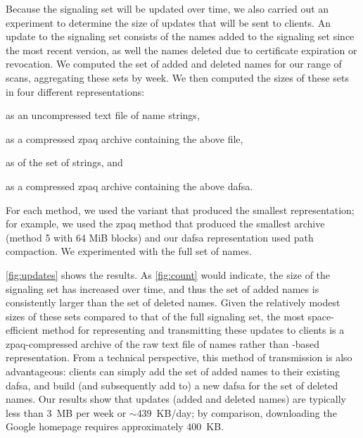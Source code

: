 Because the signaling set will be updated over time, we also carried out an
experiment to determine the size of updates that will be sent to clients. 
An update to the signaling set consists of the names added to the signaling
set since the most recent version, as well the names 
deleted due to certificate expiration or revocation. We computed the set of
added and deleted names for our range of scans, aggregating these sets by week.
We then computed the sizes of these sets in four different representations:
\begin{inparaenum}[(1)]
\item as an uncompressed text file of name strings,
\item as a compressed zpaq archive containing the above file,
\item as  of the set of strings, and
\item as a compressed zpaq archive containing the above \ac{dafsa}.
\end{inparaenum}
For each method, we used the variant that produced the smallest representation;
for example, we used the zpaq method that produced the smallest archive (method
5 with 64 MiB blocks) and our \ac{dafsa} representation used path compaction.
We experimented with the full set of names.

\autoref{fig:updates} shows the results. As
\autoref{fig:count} would indicate, the size of the signaling set has increased
over time, and thus the set of added names is consistently larger than the set
of deleted names. Given the relatively modest sizes of these sets compared to
that of the full signaling set, the most space-efficient method for representing
and transmitting these updates to clients is a zpaq-compressed archive
of the raw text file of names rather than -based representation. From
a technical perspective, this method of transmission is also advantageous:
clients can simply add the set of added names to their existing \ac{dafsa}, and
build (and subsequently add to) a new \ac{dafsa} for the set of deleted names.
Our results show that updates (added and deleted names) are typically less than
3~MB per week or $\sim$439~KB/day; by comparison, downloading the Google
homepage requires approximately 400~KB.


